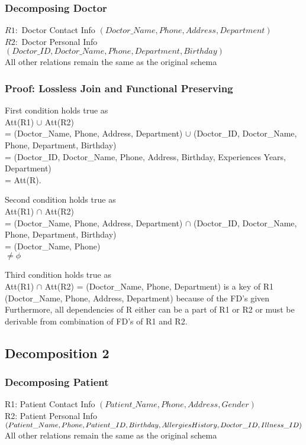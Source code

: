 \documentclass[12pt,arial]{article}
\begin{document}
\subsubsection{Decomposing Doctor}
$R1:$ Doctor Contact Info $(Doctor\_Name, Phone, Address, Department)$\\
$R2:$ Doctor Personal Info $(Doctor\_ID, Doctor\_Name, Phone, Department, Birthday)$ \\ \hfil \break
All other relations remain the same as the original schema
\subsubsection{Proof: Lossless Join and Functional Preserving}
 First condition holds true as \\Att(R1) $\cup$ Att(R2) \\= (Doctor\_Name, Phone, Address, Department) $\cup$ (Doctor\_ID, Doctor\_Name, Phone, Department, Birthday) \\= (Doctor\_ID, Doctor\_Name, Phone, Address, Birthday, Experiences Years, Department) \\= Att(R).\\ \hfil \break

Second condition holds true as \\Att(R1) $\cap$  Att(R2) \\= (Doctor\_Name, Phone, Address, Department) $\cap$ (Doctor\_ID, Doctor\_Name, Phone, Department, Birthday) \\= (Doctor\_Name, Phone) \\$\neq \phi$\\ \hfil \break

Third condition holds true as \\Att(R1) $\cap$ Att(R2) = (Doctor\_Name, Phone, Department) is a key of R1 (Doctor\_Name, Phone, Address, Department) because of the FD's given\\ \hfil \break
Furthermore, all dependencies of R either can be a part of R1 or R2 or must be derivable from combination of FD’s of R1 and R2.\\ \hfil \break
\subsection{Decomposition 2}
\subsubsection{Decomposing Patient}
R1: Patient Contact Info $(Patient\_Name, Phone, Address,Gender)$\\
R2: Patient Personal Info $(Patient\_Name, Phone, Patient\_ID, \\Birthday, Allergies History, Doctor\_ID, Illness\_ID)$\\ \hfil \break
All other relations remain the same as the original schema
\end{document}

